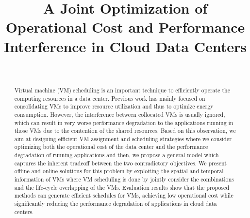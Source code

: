 \documentclass[10pt,journal]{IEEEtran}
\begin{document}
\title{A	 Joint Optimization of Operational Cost and Performance Interference in Cloud Data Centers}


\author{\\
}











\maketitle

\begin{abstract}
Virtual machine (VM) scheduling is an important technique to efficiently operate the computing resources in a data center. Previous work has mainly focused on consolidating VMs to improve resource utilization and thus to optimize energy consumption. However, the interference between collocated VMs is usually ignored, which can result in very worse performance degradation to the applications running in those VMs due to the contention of the shared resources. Based on this observation, we aim at designing efficient VM assignment and scheduling strategies where we consider optimizing both the operational cost of the data center and the performance degradation of running applications and then, we propose a general model which captures the inherent tradeoff between the two contradictory objectives. We present offline and online solutions for this problem by exploiting the spatial and temporal information of VMs where VM scheduling is done by jointly consider the combinations and the life-cycle overlapping of the VMs. Evaluation results show that the proposed methods can generate efficient schedules for VMs, achieving low operational cost while significantly reducing the performance degradation of applications in cloud data centers.
\end{abstract}
\end{document}
